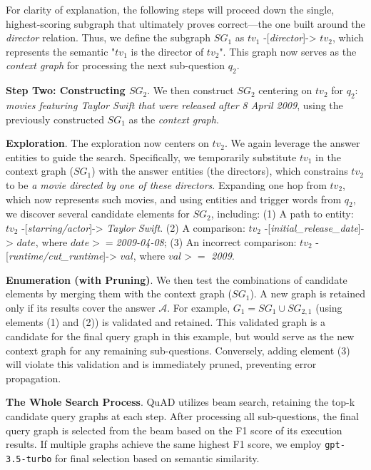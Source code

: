 \documentclass[runningheads]{llncs}
\begin{document}
For clarity of explanation, the following steps will proceed down the single, highest-scoring subgraph that ultimately proves correct—the one built around the \textit{director} relation. Thus, we define the subgraph $SG_1$ as $tv_1$ -[\textit{director}]-> $tv_2$, which represents the semantic "$tv_1$ is the director of $tv_2$". This graph now serves as the \textit{context graph} for processing the next sub-question $q_2$.
 
\noindent \textbf{Step Two: Constructing $SG_2$}.
We then construct $SG_2$ centering on $tv_2$ for $q_2$: \textit{movies featuring Taylor Swift that were released after 8 April 2009}, using the previously constructed $SG_1$ as the \textit{context graph}.

\textbf{Exploration}.
The exploration now centers on $tv_2$. We again leverage the answer entities to guide the search. Specifically, we temporarily substitute $tv_1$ in the context graph ($SG_1$) with the answer entities (the directors), which constrains $tv_2$ to be \textit{a movie directed by one of these directors}. Expanding one hop from $tv_2$, which now represents such movies, and using entities and trigger words from $q_2$, we discover several candidate elements for $SG_2$, including: 
(1) A path to entity: $tv_2$ -[\textit{starring/actor}]-> \textit{Taylor Swift}. 
(2) A comparison: $tv_2$ -[\textit{initial\_release\_date}]-> $date$, where $date >= $\textit{2009-04-08}; 
(3) An incorrect comparison: $tv_2$ -[\textit{runtime/cut\_runtime}]-> $val$, where $val >=$ \textit{2009}.


\textbf{Enumeration (with Pruning)}.
We then test the combinations of candidate elements by merging them with the context graph ($SG_1$). A new graph is retained only if its results cover the answer $\mathcal{A}$.
For example, $G_1 = SG_1 \cup SG_{2,1}$ (using elements (1) and (2)) is validated and retained.
This validated graph is a candidate for the final query graph in this example, but would serve as the new context graph for any remaining sub-questions.
Conversely, adding element (3) will violate this validation and is immediately pruned, preventing error propagation.

\noindent \textbf{The Whole Search Process}.
QuAD utilizes beam search, retaining the top-k candidate query graphs at each step. After processing all sub-questions, the final query graph is selected from the beam based on the F1 score of its execution results. If multiple graphs achieve the same highest F1 score, we employ \texttt{gpt-3.5-turbo} for final selection based on semantic similarity.
\end{document}

